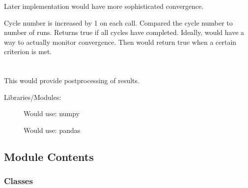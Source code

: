 \documentclass[letterpaper,10pt,english]{sphinxmanual}
\begin{document}
\begin{fulllineitems}
\sphinxAtStartPar
Later implementation would have more sophisticated convergence.

\begin{fulllineitems}
\label{\detokenize{autoapi/flo103_ConvergenceChecker/index:flo103_ConvergenceChecker.flo103_ConvergenceChecker.is_converged}}
\sphinxAtStartPar
Cycle number is increased by 1 on each call.
Compared the cycle number to number of runs.
Returns true if all cycles have completed.
Ideally, would have a way to actually monitor convergence.
Then would return true when a certain criterion is met.

\end{fulllineitems}


\end{fulllineitems}



\section{}
\label{\detokenize{autoapi/flo103_PostProcessor/index:module-flo103_PostProcessor}}\label{\detokenize{autoapi/flo103_PostProcessor/index:flo103-postprocessor}}\label{\detokenize{autoapi/flo103_PostProcessor/index::doc}}
\sphinxAtStartPar
This would provide postprocessing of results.
\begin{description}
\item[{Libraries/Modules:}] \leavevmode
\sphinxAtStartPar
Would use: numpy

\sphinxAtStartPar
Would use: pandas

\end{description}


\subsection{Module Contents}
\label{\detokenize{autoapi/flo103_PostProcessor/index:module-contents}}

\subsubsection{Classes}
\label{\detokenize{autoapi/flo103_PostProcessor/index:classes}}
\end{document}
